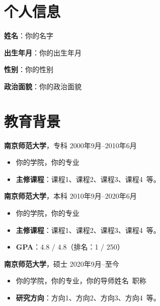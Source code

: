 \documentclass[11pt]{article}
\newlength{\iconwidth}
\begin{document}
    \begin{minipage}[t]{0.78\textwidth}
        \begin{minipage}[t]{\textwidth}
        \section[个人信息]{\makebox[\iconwidth][c]{\color{primary_color}{\faAddressCard}}\quad 个人信息}
        \begin{minipage}[t]{0.5\textwidth}
            \textbf{姓\qquad 名}：你的名字

            \vspace{0.5em}
            \textbf{出生年月}：你的出生年月
        \end{minipage}
        \begin{minipage}[t]{0.35\textwidth}
            \textbf{性\qquad 别}：你的性别

            \vspace{0.5em}
            \textbf{政治面貌}：你的政治面貌
        \end{minipage}
        \vspace{1.2em}
        \end{minipage}

        \begin{minipage}[t]{\textwidth}
        \section[教育背景]{\makebox[\iconwidth][c]{\color{primary_color}{\faGraduationCap}}\quad 教育背景}

        {\large \textbf{南京师范大学}}，专科 \hfill 2000年9月--2010年6月
        \begin{itemize}
            \item 你的学院，你的专业
            \item \textbf{主修课程}：课程1、课程2、课程3、课程4\ 等。
        \end{itemize}

        \vspace{0.5em}
        {\large \textbf{南京师范大学}}，本科 \hfill 2010年9月--2020年6月
        \begin{itemize}
            \item 你的学院，你的专业
            \item \textbf{主修课程}：课程1、课程2、课程3、课程4\ 等。
            \item \textbf{GPA}：4.8 / 4.8（排名：1 / 250）
        \end{itemize}

        \vspace{0.5em}
        {\large \textbf{南京师范大学}}，硕士 \hfill 2020年9月--至今
        \begin{itemize}
            \item 你的学院，你的专业，你的导师姓名\ 职称
            \item \textbf{研究方向}：方向1、方向2、方向3、方向4\ 等。
        \end{itemize}

        \vspace{1.2em}
        \end{minipage}
    \end{minipage}
\end{document}
